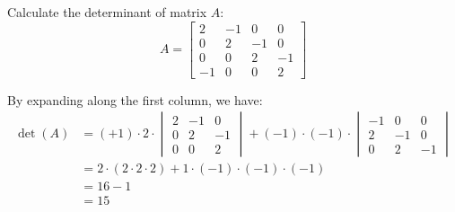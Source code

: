 \question Calculate the determinant of matrix $A$:
\[
    A = \begin{bmatrix}
        2 & -1 & 0 & 0 \\
        0 & 2 & -1 & 0 \\
        0 & 0 & 2 & -1 \\
        -1 & 0 & 0 & 2
    \end{bmatrix}
\]

\begin{solution}
    By expanding along the first column, we have:
    \begin{align*}
        \det(A) &= (+1)\cdot 2 \cdot \begin{vmatrix}
            2 & -1 & 0 \\
            0 & 2 & -1 \\
            0 & 0 & 2
        \end{vmatrix} + (-1)\cdot (-1) \cdot \begin{vmatrix}
            -1 & 0 & 0 \\
            2 & -1 & 0 \\
            0 & 2 & -1
        \end{vmatrix} \\
        &= 2 \cdot (2 \cdot 2 \cdot 2) + 1 \cdot (-1) \cdot (-1) \cdot (-1) \\
        &= 16 - 1 \\
        &= \boxed{15}
    \end{align*}
\end{solution}